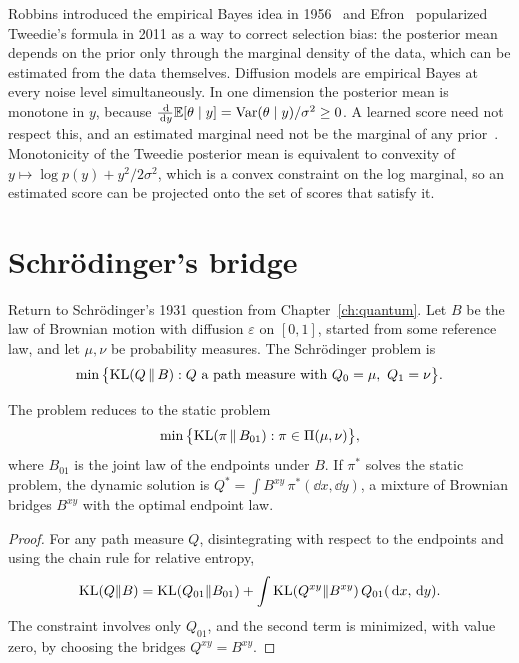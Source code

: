 Robbins introduced the empirical Bayes idea in 1956~\cite{robbins1956} and Efron~\cite{efron2011} popularized Tweedie's formula in 2011 as a way to correct selection bias: the posterior mean depends on the prior only through the marginal density of the data, which can be estimated from the data themselves. Diffusion models are empirical Bayes at every noise level simultaneously. In one dimension the posterior mean is monotone in $y$, because $\frac{\,\mathrm{d}}{\,\mathrm{d} y}\mathbb{E}[\theta\mid y] = \mathrm{Var}(\theta\mid y)/\sigma^2\geq0$. A learned score need not respect this, and an estimated marginal need not be the marginal of any prior~\cite{dattapolson2025}. Monotonicity of the Tweedie posterior mean is equivalent to convexity of $y\mapsto\log p(y)+y^2/2\sigma^2$, which is a convex constraint on the log marginal, so an estimated score can be projected onto the set of scores that satisfy it.

\section{Schr\"odinger's bridge}

Return to Schr\"odinger's 1931 question from Chapter~\ref{ch:quantum}. Let $B$ be the law of Brownian motion with diffusion $\varepsilon$ on $[0,1]$, started from some reference law, and let $\mu,\nu$ be probability measures. The Schr\"odinger problem is
\[
\min\big\{\mathrm{KL}(Q\,\|\,B):Q\text{ a path measure with }Q_0 = \mu,\ Q_1 = \nu\big\}.
\]

\begin{theorem}
\label{thm:static_reduction}
The problem reduces to the static problem
\[
\min\big\{\mathrm{KL}(\pi\,\|\,B_{01}):\pi\in\Pi(\mu,\nu)\big\},
\]
where $B_{01}$ is the joint law of the endpoints under $B$. If $\pi^*$ solves the static problem, the dynamic solution is $Q^* = \int B^{xy}\,\pi^*(\dd x,\dd y)$, a mixture of Brownian bridges $B^{xy}$ with the optimal endpoint law.
\end{theorem}

\begin{proof}
For any path measure $Q$, disintegrating with respect to the endpoints and using the chain rule for relative entropy,
\[
\mathrm{KL}(Q\|B) = \mathrm{KL}(Q_{01}\|B_{01})+\int\mathrm{KL}(Q^{xy}\|B^{xy})\,Q_{01}(\,\mathrm{d} x,\,\mathrm{d} y).
\]
The constraint involves only $Q_{01}$, and the second term is minimized, with value zero, by choosing the bridges $Q^{xy} = B^{xy}$.
\end{proof}

